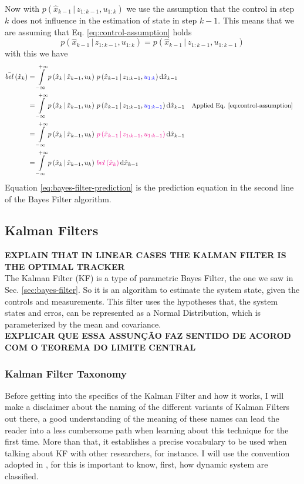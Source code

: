 \documentclass[12pt]{article}
\newcommand{\bel}{\mathop{bel}} %
\newcommand{\given}{\,|\,} %
\newcommand{\parentheses}[1]{\left(#1\right)}
\newcommand{\belF}[1]{\mathop{bel}\parentheses{#1}} %
\newcommand{\pr}[1]{p\parentheses{#1}}
\newcommand{\Int}[4][x]{\int\limits_{#2}^{#3} #4 \dd #1}
\newcommand{\blue}[1]{\color{blue}#1\color{black}}
\newcommand{\magenta}[1]{\color{magenta}#1\color{black}}
\begin{document}
Now with $\pr{\hat{x}_{k-1} \given z_{1:k-1}, u_{1:k}}$ we use the assumption that the control in step $k$ does not influence in the estimation of state in step $k-1$. This means that we are assuming that Eq. \ref{eq:control-assumption} holds
\begin{equation}
    \pr{\hat{x}_{k-1} \given z_{1:k-1}, u_{1:k}} = \pr{\hat{x}_{k-1} \given z_{1:k-1}, u_{1:k-1}}
    \label{eq:control-assumption}
\end{equation}
with this we have
\begin{equation}
\begin{aligned}
    \bar{\bel}\parentheses{\hat{x}_k} &= \Int[\hat{x}_{k-1}]{-\infty}{+\infty}{\pr{\hat{x}_k \given \hat{x}_{k-1}, u_k} \, \pr{\hat{x}_{k-1} \given z_{1:k-1}, \blue{u_{1:k}}} }\\
    &= \Int[\hat{x}_{k-1}]{-\infty}{+\infty}{\pr{\hat{x}_k \given \hat{x}_{k-1}, u_k} \, \pr{\hat{x}_{k-1} \given z_{1:k-1}, \blue{u_{1:k-1}}} } && \small\text{Applied Eq. \ref{eq:control-assumption}}\\
    &= \Int[\hat{x}_{k-1}]{-\infty}{+\infty}{\pr{\hat{x}_k \given \hat{x}_{k-1}, u_k} \, \magenta{\pr{\hat{x}_{k-1} \given z_{1:k-1}, u_{1:k-1}}} } \\
    &= \Int[\hat{x}_{k-1}]{-\infty}{+\infty}{\pr{\hat{x}_k \given \hat{x}_{k-1}, u_k} \, \magenta{\belF{\hat{x}_k}} }
\end{aligned}
\label{eq:bayes-filter-prediction}
\end{equation}
Equation \ref{eq:bayes-filter-prediction} is the prediction equation in the second line of the Bayes Filter algorithm.


\subsection{Kalman Filters}
\magenta{\textbf{EXPLAIN THAT IN LINEAR CASES THE KALMAN FILTER IS THE OPTIMAL TRACKER}}\\
The Kalman Filter (KF) is a type of parametric Bayes Filter, the one we saw in Sec. \ref{sec:bayes-filter}. So it is an algorithm to estimate the system state, given the controls and measurements. This filter uses the hypotheses that, the system states and erros, can be represented as a Normal Distribution, which is parameterized by the mean and covariance. \\
\magenta{\textbf{EXPLICAR QUE ESSA ASSUNÇÃO FAZ SENTIDO DE ACOROD COM O TEOREMA DO LIMITE CENTRAL}}

\subsubsection{Kalman Filter Taxonomy}
Before getting into the specifics of the Kalman Filter and how it works, I will make a disclaimer about the naming of the different variants of Kalman Filters out there, a good understanding of the meaning of these names can lead the reader into a less cumbersome path when learning about this technique for the first time. More than that, it establishes a precise vocabulary to be used when talking about KF with other researchers, for instance. I will use the convention adopted in \cite[p. ~151]{lewis2017optimal}, for this is important to know, first, how dynamic system are classified. 
\end{document}
